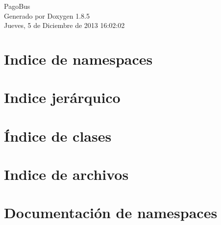 \documentclass[twoside]{book}
\newcommand{\clearemptydoublepage}{%
  \newpage{\pagestyle{empty}\cleardoublepage}%
}
\begin{document}
\begin{titlepage}
\vspace*{7cm}
\begin{center}%
{\Large Pago\-Bus }\\
\vspace*{1cm}
{\large Generado por Doxygen 1.8.5}\\
\vspace*{0.5cm}
{\small Jueves, 5 de Diciembre de 2013 16:02:02}\\
\end{center}
\end{titlepage}
\clearemptydoublepage
\tableofcontents
\clearemptydoublepage
{}

\chapter{Indice de namespaces}

\chapter{Indice jerárquico}

\chapter{Índice de clases}

\chapter{Indice de archivos}

\chapter{Documentación de namespaces}






\end{document}
